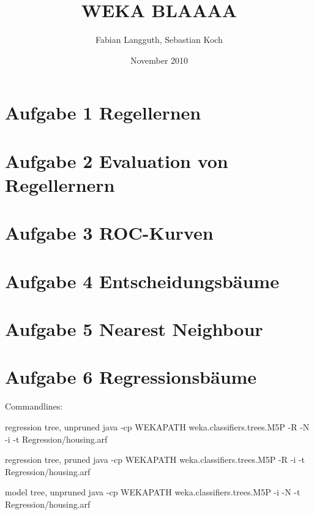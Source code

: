 


\areaset[66pt]{415pt}{600pt}



\title{WEKA BLAAAA}
\author{Fabian Langguth, Sebastian Koch}
\date{November 2010}

\maketitle

\section{Aufgabe 1 Regellernen} 


\section{Aufgabe 2 Evaluation von Regellernern}


\section{Aufgabe 3 ROC-Kurven}


\section{Aufgabe 4 Entscheidungsb\"aume}


\section{Aufgabe 5 Nearest Neighbour}


\section{Aufgabe 6 Regressionsb\"aume}
\label{sec:aufgabe_6_regressionsbaume}

Commandlines: 

regression tree, unpruned
java -cp WEKAPATH weka.classifiers.trees.M5P -R -N -i -t Regression/housing.arf

regression tree, pruned
java -cp WEKAPATH weka.classifiers.trees.M5P -R -i -t Regression/housing.arf

model tree, unpruned
java -cp WEKAPATH weka.classifiers.trees.M5P -i -N -t Regression/housing.arf

